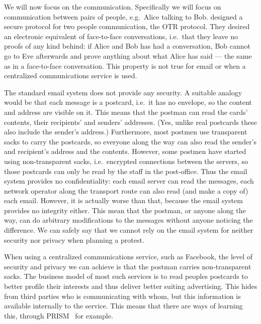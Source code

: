 We will now focus on the communication.
Specifically we will focus on communication between pairs of people, e.g.\ 
Alice talking to Bob.
\citeauthor{otr2004} designed a secure protocol for two people communication, 
the \ac{OTR} protocol.
They desired an electronic equivalent of face-to-face conversations, i.e.\ that 
they leave no proofs of any kind behind:
if Alice and Bob has had a conversation, Bob cannot go to Eve afterwards and 
prove anything about what Alice has said --- the same as in a face-to-face 
conversation.
This property is not true for email or when a centralized communications 
service is used.

The standard email system does not provide any security.
A suitable analogy would be that each message is a postcard, i.e.\ it has no 
envelope, so the content and address are visible on it.
This means that the postman can read the cards' contents, their recipients' and
senders' addresses.
(Yes, unlike real postcards these also include the sender's address.)
Furthermore, most postmen use transparent sacks to carry the postcards, so 
everyone along the way can also read the sender's and recipient's address and 
the contents.
However, some postmen have started using non-transparent sacks, i.e.\ encrypted 
connections between the servers, so those postcards can only be read by the 
staff in the post-office.
Thus the email system provides no confidentiality: each email server can read 
the messages, each network operator along the transport route can also read 
(and make a copy of) each email.
However, it is actually worse than that, because the email system provides no 
integrity either.
This mean that the postman, or anyone along the way, can do arbitrary 
modifications to the messages without anyone noticing the difference.
We can safely say that we cannot rely on the email system for neither security 
nor privacy when planning a protest.

When using a centralized communications service, such as Facebook, the level of
security and privacy we can achieve is that the postman carries non-transparent
sacks.
The business model of most such services is to read peoples postcards to better
profile their interests and thus deliver better suiting advertising.
This hides from third parties who is communicating with whom, but this 
information is available internally to the service.
This means that there are ways of learning this, through PRISM~\cite{Prism} for 
example.

